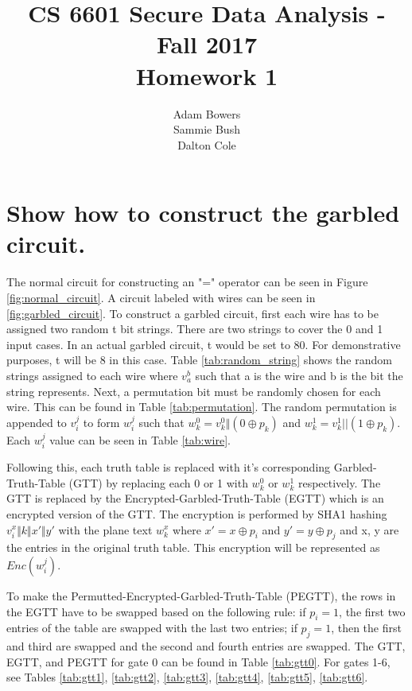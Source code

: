 \documentclass[times]{article}
\begin{document}
	\title{CS 6601 Secure Data Analysis - Fall 2017 \\ Homework 1}
	\author{Adam Bowers \\ Sammie Bush \\ Dalton Cole}
	\date{}
	\maketitle

	\section{Show how to construct the garbled circuit.}
	The normal circuit for constructing an "=" operator can be seen in Figure \ref{fig:normal_circuit}. A circuit labeled with wires can be seen in \ref{fig:garbled_circuit}. To construct a garbled circuit, first each wire has to be assigned two random t bit strings. There are two strings to cover the 0 and 1 input cases. In an actual garbled circuit, t would be set to 80. For demonstrative purposes, t will be 8 in this case. Table \ref{tab:random_string} shows the random strings assigned to each wire where $v_a^b$ such that a is the wire and b is the bit the string represents. Next, a permutation bit must be randomly chosen for each wire. This can be found in Table \ref{tab:permutation}. The random permutation is appended to $v_i^j$ to form $w_i^j$ such that $w_k^0 = v_k^0 \Vert (0 \oplus p_k)$ and $w_k^1 = v_k^1 || (1 \oplus p_k)$. Each $w_i^j$ value can be seen in Table \ref{tab:wire}. 

	Following this, each truth table is replaced with it's corresponding Garbled-Truth-Table (GTT) by replacing each 0 or 1 with $w_k^0$ or $w_k^1$ respectively. The GTT is replaced by the Encrypted-Garbled-Truth-Table (EGTT) which is an encrypted version of the GTT. The encryption is performed by SHA1 hashing $v_i^x \Vert k \Vert x' \Vert y'$ with the plane text $w_k^x$ where $x' = x \oplus p_i$ and  $y' = y \oplus p_j$ and x, y are the entries in the original truth table. This encryption will be represented as $Enc(w_i^j)$. 

	To make the Permutted-Encrypted-Garbled-Truth-Table (PEGTT), the rows in the EGTT have to be swapped based on the following rule: if $p_i = 1$, the first two entries of the table are swapped with the last two entries; if $p_j = 1$, then the first and third are swapped and the second and fourth entries are swapped. The GTT, EGTT, and PEGTT for gate 0 can be found in Table \ref{tab:gtt0}. For gates 1-6, see Tables \ref{tab:gtt1}, \ref{tab:gtt2}, \ref{tab:gtt3}, \ref{tab:gtt4}, \ref{tab:gtt5}, \ref{tab:gtt6}.
	
\end{document}
